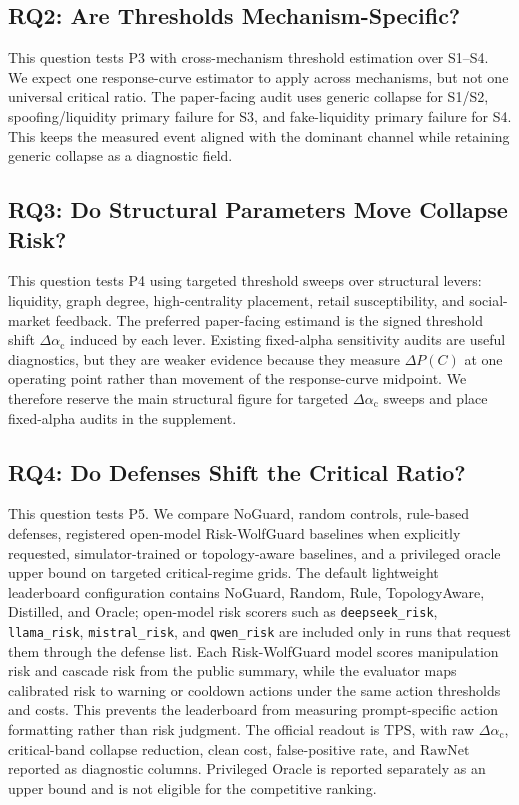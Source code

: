 \documentclass[letterpaper]{article} %
\newcommand{\alphac}{\alpha_{\mathrm{c}}}
\newcommand{\shift}{\Delta\alpha_{\mathrm{c}}}
\newcommand{\tps}{\mathrm{TPS}}
\newcommand{\rawnet}{\mathrm{RawNet}}
\begin{document}
\subsection{RQ2: Are Thresholds Mechanism-Specific?}

This question tests P3 with cross-mechanism threshold estimation over S1--S4.
We expect one response-curve estimator to apply across mechanisms, but not one
universal critical ratio. The paper-facing audit uses generic collapse for
S1/S2, spoofing/liquidity primary failure for S3, and fake-liquidity primary
failure for S4. This keeps the measured event aligned with the dominant channel
while retaining generic collapse as a diagnostic field.

\subsection{RQ3: Do Structural Parameters Move Collapse Risk?}

This question tests P4 using targeted threshold sweeps over structural levers:
liquidity, graph degree, high-centrality placement, retail susceptibility, and
social-market feedback. The preferred paper-facing estimand is the signed
threshold shift \(\Delta\alphac\) induced by each lever. Existing fixed-alpha
sensitivity audits are useful diagnostics, but they are weaker evidence because
they measure \(\Delta P(C)\) at one operating point rather than movement of the
response-curve midpoint. We therefore reserve the main structural figure for
targeted \(\Delta\alphac\) sweeps and place fixed-alpha audits in the
supplement.

\subsection{RQ4: Do Defenses Shift the Critical Ratio?}

This question tests P5. We compare NoGuard, random controls, rule-based
defenses, registered open-model Risk-WolfGuard baselines when explicitly
requested, simulator-trained or topology-aware baselines, and a privileged
oracle upper bound on targeted critical-regime grids. The default lightweight
leaderboard configuration contains NoGuard, Random, Rule, TopologyAware,
Distilled, and Oracle; open-model risk scorers such as \texttt{deepseek\_risk},
\texttt{llama\_risk}, \texttt{mistral\_risk}, and \texttt{qwen\_risk} are
included only in runs that request them through the defense list. Each
Risk-WolfGuard model scores manipulation risk and cascade risk from the public
summary, while the evaluator maps calibrated risk to warning or cooldown
actions under the same action thresholds and costs. This prevents the
leaderboard from measuring prompt-specific action formatting rather than risk
judgment. The official readout is \(\tps\), with raw \(\shift\), critical-band
collapse reduction, clean cost, false-positive rate, and \(\rawnet\) reported
as diagnostic columns. Privileged Oracle is reported
separately as an upper bound and is not eligible for the competitive ranking.
\end{document}
